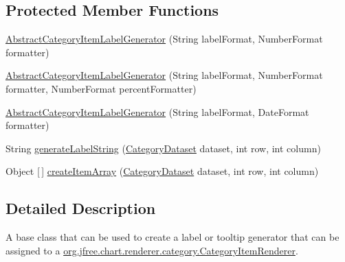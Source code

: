 \subsection*{Protected Member Functions}
\begin{DoxyCompactItemize}
\item 
\mbox{\hyperlink{classorg_1_1jfree_1_1chart_1_1labels_1_1_abstract_category_item_label_generator_a707b913a83f87fee80e547854c1185f6}{Abstract\+Category\+Item\+Label\+Generator}} (String label\+Format, Number\+Format formatter)
\item 
\mbox{\hyperlink{classorg_1_1jfree_1_1chart_1_1labels_1_1_abstract_category_item_label_generator_a2f2cd7b8bd0b7c896e26d4d7f3d373ab}{Abstract\+Category\+Item\+Label\+Generator}} (String label\+Format, Number\+Format formatter, Number\+Format percent\+Formatter)
\item 
\mbox{\hyperlink{classorg_1_1jfree_1_1chart_1_1labels_1_1_abstract_category_item_label_generator_a838556843383b9b22edbdab763f35d57}{Abstract\+Category\+Item\+Label\+Generator}} (String label\+Format, Date\+Format formatter)
\item 
String \mbox{\hyperlink{classorg_1_1jfree_1_1chart_1_1labels_1_1_abstract_category_item_label_generator_a4860a2f577cf4bc44cb9c4bc447c8846}{generate\+Label\+String}} (\mbox{\hyperlink{interfaceorg_1_1jfree_1_1data_1_1category_1_1_category_dataset}{Category\+Dataset}} dataset, int row, int column)
\item 
Object \mbox{[}$\,$\mbox{]} \mbox{\hyperlink{classorg_1_1jfree_1_1chart_1_1labels_1_1_abstract_category_item_label_generator_ac092296d76ccb5e9df9737148139e961}{create\+Item\+Array}} (\mbox{\hyperlink{interfaceorg_1_1jfree_1_1data_1_1category_1_1_category_dataset}{Category\+Dataset}} dataset, int row, int column)
\end{DoxyCompactItemize}


\subsection{Detailed Description}
A base class that can be used to create a label or tooltip generator that can be assigned to a \mbox{\hyperlink{interfaceorg_1_1jfree_1_1chart_1_1renderer_1_1category_1_1_category_item_renderer}{org.\+jfree.\+chart.\+renderer.\+category.\+Category\+Item\+Renderer}}. 


